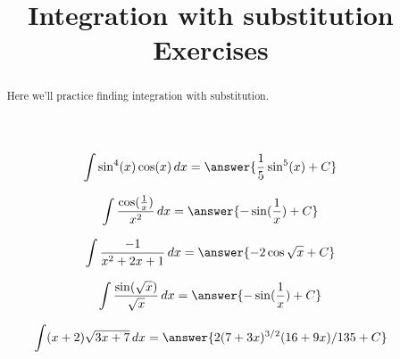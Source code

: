 \documentclass[handout]{ximera}
\title[Exercises:]{Integration with substitution Exercises}
\begin{document}
\begin{abstract}
  Here we'll practice finding integration with substitution.
\end{abstract}
\maketitle

\begin{exercise}
\[
\int \sin^4(x)\cos(x) \d x = \answer{\frac{1}{5} \sin^5(x)+C} 
\]

\end{exercise}

\begin{exercise}
\[
\int \frac{\cos(\frac{1}{x})}{x^2} \d x = \answer{-\sin(\frac{1}{x})+C}
\]

\end{exercise}

\begin{exercise}
\[
\int \frac{-1}{x^2+2x+1} \d x = \answer{-2\cos{\sqrt{x}}+C}
\]

\end{exercise}


\begin{exercise}
\[
\int \frac{\sin(\sqrt{x})}{\sqrt{x}} \d x = \answer{-\sin(\frac{1}{x})+C} 
\]

\end{exercise}

\begin{exercise}
\[
\int (x+2)\sqrt{3x+7} \d x = \answer{2 (7 + 3 x)^{3/2} (16 + 9 x)/135+C} 
\]

\end{exercise}
\end{document}
